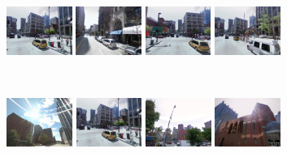 \documentclass[table]{article} %
\begin{document}
\begin{figure}[t!]
\begin{minipage}{0.34\linewidth}
        \end{minipage}
        \begin{minipage}{0.75\linewidth}
            \begin{minipage}{\linewidth} 
                \colorbox{myGreen}{\includegraphics[height=16mm]{imgs/ex3/FVsvm1}}
                \colorbox{myRed}{\includegraphics[height=16mm]{imgs/ex3/FVsvm2}}
                \colorbox{myGreen}{\includegraphics[height=16mm]{imgs/ex3/FVsvm5}}
                \colorbox{myGreen}{\includegraphics[height=16mm]{imgs/ex3/FVsvm4}}
            \end{minipage}
            \\
            \begin{minipage}{\linewidth}
                \colorbox{myRed}{\includegraphics[height=16mm]{imgs/ex3/FV1}}
                \colorbox{myGreen}{\includegraphics[height=16mm]{imgs/ex3/FV2}}
                \colorbox{myRed}{\includegraphics[height=16mm]{imgs/ex3/FV3}}
                \colorbox{myRed}{\includegraphics[height=16mm]{imgs/ex3/FV4}}

\end{minipage}
\end{minipage}
\end{figure}
\end{document}
